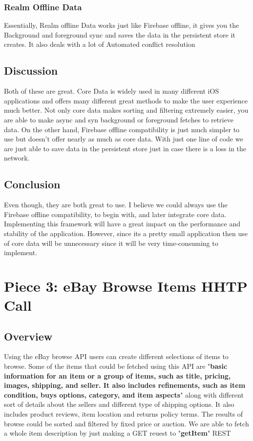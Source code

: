 \documentclass[onecolumn, draftclsnofoot,10pt, compsoc]{IEEEtran}
\begin{document}
\subsubsection{Realm Offline Data\cite{Realm}}
Essentially, Realm offline Data works just like Firebase offline, it gives you the Background and foreground sync and saves the data in the persistent store it creates. It also deals with a lot of Automated conflict resolution

\subsection{Discussion}
Both of these are great. Core Data is widely used in many different iOS applications and offers many different great methods to make the user experience much better. Not only core data makes sorting and filtering extremely easier, you are able to make async and syn background or foreground fetches to retrieve data. On the other hand, Firebase offline compatibility is just much simpler to use but doesn't offer nearly as much as core data. With just one line of code we are just able to save data in the persistent store just in case there is a loss in the network.

\subsection{Conclusion}
Even though, they are both great to use. I believe we could always use the Firebase offline compatibility, to begin with, and later integrate core data. Implementing this framework will have a great impact on the performance and stability of the application. However, since its a pretty small application then use of core data will be unnecessary since it will be very time-consuming to implement.

\section{Piece 3: eBay Browse Items HHTP Call}
\subsection{Overview}
Using the eBay browse API users can create different selections of items to browse. Some of the items that could be fetched using this API are "\textbf{basic information for an item or a group of items, such as title, pricing, images, shipping, and seller. It also includes refinements, such as item condition, buys options, category, and item aspects}" along with different sort of details about the sellers and different type of shipping options. It also includes product reviews, item location and returns policy terms. The results of browse could be sorted and filtered by fixed price or auction. We are able to fetch a whole item description by just making a GET reuest to "\textbf{getItem}" REST
\end{document}
